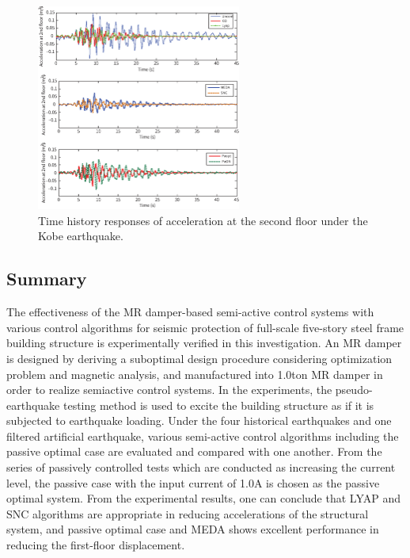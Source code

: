 \begin{figure}[!ht]
\centering
\includegraphics[width=0.6\textwidth] {figure/n3-17.eps}
\caption{Time history responses of acceleration at the second floor under the Kobe earthquake.}
\label{fig:n3-17}
\end{figure}

\subsection{Summary}
The effectiveness of the MR damper-based semi-active control systems with various control algorithms for seismic protection of full-scale five-story steel frame building structure is experimentally verified in this investigation. An MR damper is designed by deriving a suboptimal design procedure considering optimization problem and magnetic analysis, and manufactured into 1.0ton MR damper in order to realize semiactive control systems.
In the experiments, the pseudo-earthquake testing method is used to excite the building structure as if it is subjected to earthquake loading. Under the four historical earthquakes and one filtered artificial earthquake, various semi-active control algorithms including the passive optimal case are evaluated and compared with one another. From the series of passively controlled tests which are conducted as increasing the current level, the passive case with the input current of 1.0A is chosen as the passive optimal system. From the experimental results, one can conclude that LYAP and SNC algorithms are appropriate in reducing accelerations of the structural system, and passive optimal case and MEDA shows excellent performance in reducing the first-floor displacement.